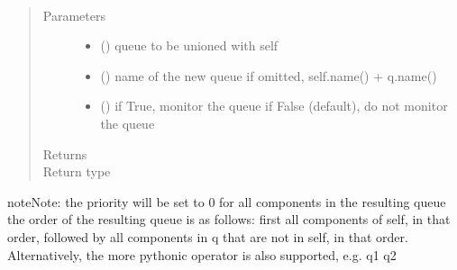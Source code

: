 \documentclass[letterpaper,10pt,english]{sphinxmanual}
\begin{document}
\begin{fulllineitems}
\begin{fulllineitems}
\end{fulllineitems}


\begin{fulllineitems}
\label{\detokenize{Reference:salabim.Queue.union}}~\begin{quote}\begin{description}
\item[{Parameters}] \leavevmode\begin{itemize}
\item {} 
 ({\hyperref[\detokenize{Reference:salabim.Queue}]{}}) \textendash{} queue to be unioned with self

\item {} 
 () \textendash{} name of the  new queue 
if omitted, self.name() + q.name()

\item {} 
 () \textendash{} if True, monitor the queue 
if False (default), do not monitor the queue

\end{itemize}

\item[{Returns}] \leavevmode
{}

\item[{Return type}] \leavevmode
{\hyperref[\detokenize{Reference:salabim.Queue}]{}}

\end{description}\end{quote}

\begin{sphinxadmonition}{note}{Note:}
the priority will be set to 0 for all components in the
resulting  queue 
the order of the resulting queue is as follows: 
first all components of self, in that order,
followed by all components in q that are not in self,
in that order. 
Alternatively, the more pythonic \textbar{} operator is also supported, e.g. q1 \textbar{} q2
\end{sphinxadmonition}

\end{fulllineitems}


\end{fulllineitems}
\end{document}
